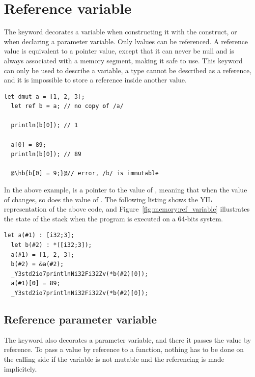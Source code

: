 \section{Reference variable}
\label{sec:memory:ref_variable}

The  keyword decorates a variable when constructing it
with the  construct, or when declaring a parameter variable. Only
lvalues can be referenced. A reference value is equivalent to a pointer value,
except that it can never be null and is always associated with a memory segment,
making it safe to use. This keyword can only be used to describe a variable, a
type cannot be described as a reference, and it is impossible to store a
reference inside another value.

\begin{lstlisting}[style=coloredverbatimError, escapechar=@]
  let dmut a = [1, 2, 3];
  let ref b = a; // no copy of /a/

  println(b[0]); // 1

  a[0] = 89;
  println(b[0]); // 89

  @\hb{b[0] = 9;}@// error, /b/ is immutable
\end{lstlisting}

In the above example,  is a pointer to the value of ,
meaning that when the value of  changes, so does the value of
. The following listing shows the YIL representation of the above
code, and Figure~\ref{fig:memory:ref_variable} illustrates the state of the stack when the
program is executed on a 64-bits system.

\begin{lstlisting}[style=lyilVerb]
  let a(#1) : [i32;3];
  let b(#2) : *([i32;3]);
  a(#1) = [1, 2, 3];
  b(#2) = &a(#2);
  _Y3std2io7printlnNi32Fi32Zv(*b(#2)[0]);
  a(#1)[0] = 89;
  _Y3std2io7printlnNi32Fi32Zv(*b(#2)[0]);
\end{lstlisting}



\subsection{Reference parameter variable}
\label{sec:memory:ref_param}

The  keyword also decorates a parameter variable, and there it passes
the value by reference. To pass a value by
reference to a function, nothing has to be done on the calling side if the
variable is not mutable and the referencing is made implicitely.

